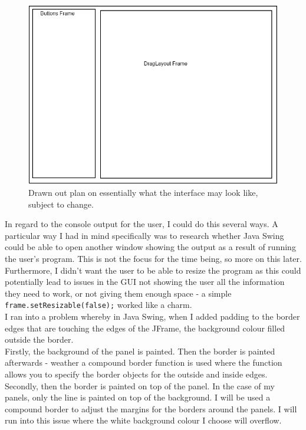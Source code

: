 \documentclass[a4paper, 12pt]{article}
\begin{document}
            \clearpage
            \begin{figure}[h]
                \centering
                \includegraphics[width=120mm]{design.png}
                \caption{Drawn out plan on essentially what the interface may look like, subject to change.}
            \end{figure}

            In regard to the console output for the user, I could do this several ways. A particular way
            I had in mind specifically was to research whether Java Swing could be able to open another
            window showing the output as a result of running the user's program. This is not the focus
            for the time being, so more on this later. Furthermore, I didn't want the user to be able
            to resize the program as this could potentially lead to issues in the GUI not showing the
            user all the information they need to work, or not giving them enough space - a simple
            \texttt{frame.setResizable(false);} worked like a charm. \\

            I ran into a problem whereby in Java Swing, when I added padding to the border edges that
            are touching the edges of the JFrame, the background colour filled outside the border. \\

            \clearpage
            Firstly, the background of the panel is painted. Then the border is painted afterwards
            - weather a compound border function is used where the function allows you to
            specify the border objects for the outside and inside edges. Secondly, then the border
            is painted on top of the panel. In the case of my panels, only the line is painted on
            top of the background. I will be used a compound border to adjust the margins for the
            borders around the panels. I will run into this issue where the white background colour
            I choose will overflow. \\
\end{document}
